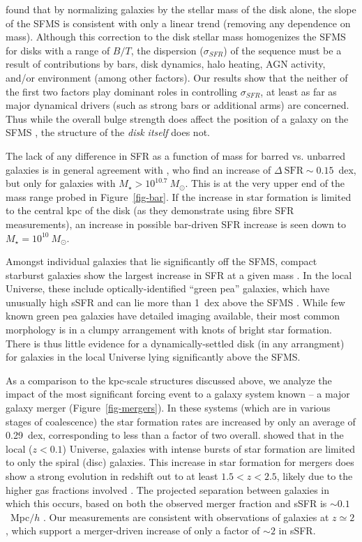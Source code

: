 \documentclass{emulateapj}
\begin{document}
\citet{abr14} found that by normalizing galaxies by the stellar mass of the disk alone, the slope of the SFMS is consistent with only a linear trend (removing any dependence on mass). Although this correction to the disk stellar mass homogenizes the SFMS for disks with a range of $B/T$, the dispersion ($\sigma_{SFR}$) of the sequence must be a result of contributions by bars, disk dynamics, halo heating, AGN activity, and/or environment (among other factors). Our results show that the neither of the first two factors play dominant roles in controlling $\sigma_{SFR}$, at least as far as major dynamical drivers (such as strong bars or additional arms) are concerned. Thus while the overall bulge strength does affect the position of a galaxy on the SFMS \citep{mar09,che12,fan13,kav14,lan14,oma14}, the structure of the \emph{disk itself} does not.

The lack of any difference in SFR as a function of mass for barred vs. unbarred galaxies is in general agreement with \citet{ell11}, who find an increase of $\Delta~\textrm{SFR}\sim0.15$~dex, but only for galaxies with $M_\star>10^{10.7}~M_\odot$. This is at the very upper end of the mass range probed in Figure~\ref{fig-bar}. If the increase in star formation is limited to the central kpc of the disk (as they demonstrate using fibre SFR measurements), an increase in possible bar-driven SFR increase is seen down to $M_\star=10^{10}~M_\odot$. 

Amongst individual galaxies that lie significantly off the SFMS, compact starburst galaxies show the largest increase in SFR at a given mass \citep{elb11}. In the local Universe, these include optically-identified ``green pea'' galaxies, which have unusually high sSFR and can lie more than 1~dex above the SFMS \citep{car09}. While few known green pea galaxies have detailed imaging available, their most common morphology is in a clumpy arrangement with knots of bright star formation. There is thus little evidence for a dynamically-settled disk (in any arrangment) for galaxies in the local Universe lying significantly above the SFMS. 

As a comparison to the kpc-scale structures discussed above, we analyze the impact of the most significant forcing event to a galaxy system known -- a major galaxy merger (Figure~\ref{fig-mergers}). In these systems (which are in various stages of coalescence) the star formation rates are increased by only an average of 0.29~dex, corresponding to less than a factor of two overall. \citet{dar10} showed that in the local ($z<0.1$) Universe, galaxies with intense bursts of star formation are limited to only the spiral (disc) galaxies. This increase in star formation for mergers does show a strong evolution in redshift out to at least $1.5<z<2.5$, likely due to the higher gas fractions involved \citep{dad10,rod11}. The projected separation between galaxies in which this occurs, based on both the observed merger fraction and sSFR is $\sim0.1$~Mpc$/h$ \citep{ski09}. Our measurements are consistent with observations of galaxies at $z\simeq2$ \citep{kav13b}, which support a merger-driven increase of only a factor of $\sim2$ in sSFR. 
\end{document}
